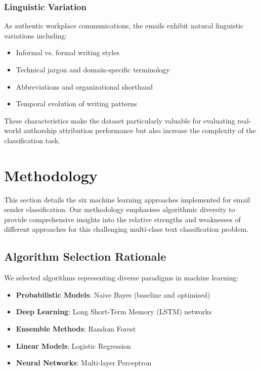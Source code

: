\documentclass[11pt,a4paper]{article}
\begin{document}
\subsubsection{Linguistic Variation}

As authentic workplace communications, the emails exhibit natural linguistic variations including:
\begin{itemize}
    \item Informal vs. formal writing styles
    \item Technical jargon and domain-specific terminology
    \item Abbreviations and organizational shorthand
    \item Temporal evolution of writing patterns
\end{itemize}

These characteristics make the dataset particularly valuable for evaluating real-world authorship attribution performance but also increase the complexity of the classification task.

\section{Methodology}

This section details the six machine learning approaches implemented for email sender classification. Our methodology emphasises algorithmic diversity to provide comprehensive insights into the relative strengths and weaknesses of different approaches for this challenging multi-class text classification problem.

\subsection{Algorithm Selection Rationale}

We selected algorithms representing diverse paradigms in machine learning:

\begin{itemize}
    \item \textbf{Probabilistic Models}: Naive Bayes (baseline and optimised)
    \item \textbf{Deep Learning}: Long Short-Term Memory (LSTM) networks
    \item \textbf{Ensemble Methods}: Random Forest
    \item \textbf{Linear Models}: Logistic Regression
    \item \textbf{Neural Networks}: Multi-layer Perceptron
\end{itemize}
\end{document}

